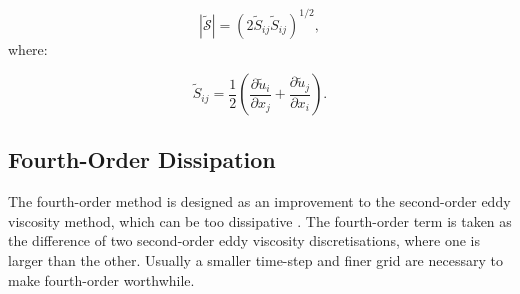 \begin{equation}
\left | \mathcal{\tilde S} \right | = (2 \tilde S_{ij} \tilde S_{ij})^{1/2},
\end{equation}
where:

\begin{equation}
\tilde S_{ij} = \frac 1 2 \left ( \frac{\partial \tilde u_i}{\partial x_j} + \frac{\partial \tilde u_j}{\partial x_i} \right ).
\end{equation}

\subsection{Fourth-Order Dissipation}

The fourth-order method is designed as an improvement to the second-order eddy viscosity method, which can be too dissipative \citep{adam}. The fourth-order term is taken as the difference of two second-order eddy viscosity discretisations, where one is larger than the other. Usually a smaller time-step and finer grid are necessary to make fourth-order worthwhile.
